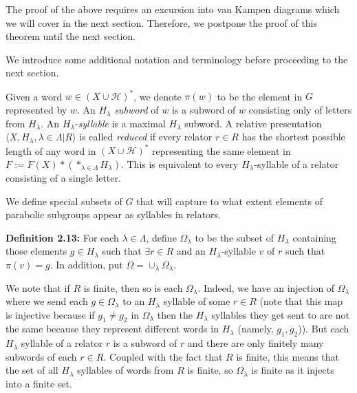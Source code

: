 \documentclass[12pt]{article}
\newcommand{\vs}{\vskip10pt}
\begin{document}
	The proof of the above requires an excursion into van Kampen diagrams which we will cover in the next section. Therefore, we postpone the proof of this theorem until the next section.
	
	\vs 
	
	We introduce some additional notation and terminology before proceeding to the next section. 
	
	\vs 
	
	Given a word $w \in (X \cup \mathcal{H})^*$, we denote $\pi(w)$ to be the element in $G$ represented by $w$. An $H_{\lambda}$ \textit{subword} of $w$ is a subword of $w$ consisting only of letters from $H_{\lambda}$. An $H_{\lambda}$-\textit{syllable} is a maximal $H_{\lambda}$ subword. A relative presentation $\langle X, H_{\lambda}, \lambda \in \Lambda \vert R \rangle $ is called \textit{reduced} if every relator $r \in R$ has the shortest possible length of any word in $(X \cup \mathcal{H})^*$ representing the same element in $F := F(X) * (*_{\lambda \in \Lambda} H_{\lambda})$. This is equivalent to every $H_{\lambda}$-syllable of a relator consisting of a single letter. 
	
	\vs 
	
	We define special subsets of $G$ that will capture to what extent elements of parabolic subgroups appear as syllables in relators.
	
	\vs 
	
	\textbf{Definition 2.13: } For each $\lambda \in \Lambda$, define $\Omega_{\lambda}$ to be the subset of $H_{\lambda}$ containing those elements $g \in H_{\lambda}$ such that $\exists r \in R$ and an $H_{\lambda}$-syllable $v$ of $r$ such that $\pi(v) = g$. In addition, put $\Omega = \cup_{\lambda} \Omega_{\lambda}$. 
	
	\vs
	
	We note that if $R$ is finite, then so is each $\Omega_{\lambda}$. Indeed, we have an injection of $\Omega_{\lambda}$ where we send each $g \in \Omega_\lambda$ to an $H_\lambda$ syllable of some $r \in R$ (note that this map is injective because if $g_1 \neq g_2$ in $\Omega_\lambda$ then the $H_\lambda$ syllables they get sent to are not the same because they represent different words in $H_\lambda$ (namely, $g_1, g_2$)). But each $H_\lambda$ syllable of a relator $r$ is a subword of $r$ and there are only finitely many subwords of each $r \in R$. Coupled with the fact that $R$ is finite, this means that the set of all $H_\lambda$ syllables of words from $R$ is finite, so $\Omega_{\lambda}$ is finite as it injects into a finite set. 
	
\end{document}
